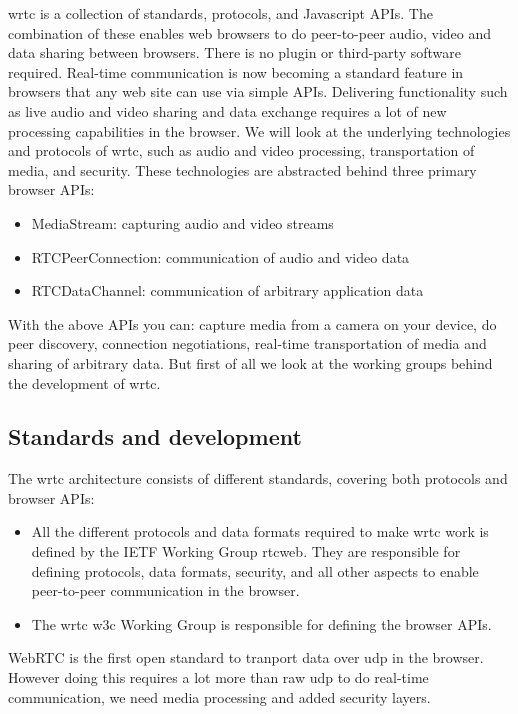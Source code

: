 
\gls{wrtc} is a collection of standards, protocols, and Javascript APIs. The combination of these enables web browsers to do peer-to-peer audio, video and data sharing between browsers. There is no plugin or third-party software required. Real-time communication is now becoming a standard feature in browsers that any web site can use via simple APIs. Delivering functionality such as live audio and video sharing and data exchange requires a lot of new processing capabilities in the browser. We will look at the underlying technologies and protocols of \gls{wrtc}, such as audio and video processing, transportation of media, and security. These technologies are abstracted behind three primary browser APIs:

\newpage
\begin{itemize}
\item MediaStream: capturing audio and video streams
\item RTCPeerConnection: communication of audio and video data
\item RTCDataChannel: communication of arbitrary application data
\end{itemize}

With the above APIs you can: capture media from a camera on your device, do peer discovery, connection negotiations, real-time transportation of media and sharing of arbitrary data. But first of all we look at the working groups behind the development of \gls{wrtc}.

\subsection{Standards and development}
The \gls{wrtc} architecture consists of different standards, covering both protocols and browser APIs:

\begin{itemize}
\item All the different protocols and data formats required to make \gls{wrtc} work is defined by the IETF Working Group \gls{rtcweb}. They are responsible for defining protocols, data formats, security, and all other aspects to enable peer-to-peer communication in the browser.
\item The \gls{wrtc} \gls{w3c} Working Group is responsible for defining the browser APIs.
\end{itemize}

WebRTC is the first open standard to tranport data over \gls{udp} in the browser. However doing this requires a lot more than raw \gls{udp} to do real-time communication, we need media processing and added security layers.

